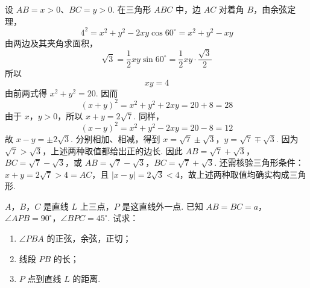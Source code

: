\begin{solution}
设 \(AB=x>0\)、\(BC=y>0\). 在三角形 \(ABC\) 中，边 \(AC\) 对着角 \(B\)，由余弦定理，
\[
4^2=x^2+y^2-2xy\cos60^\circ=x^2+y^2-xy
\]
由两边及其夹角求面积，
\[
\sqrt3=\frac12xy\sin60^\circ=\frac12xy\cdot\frac{\sqrt3}{2}
\]
所以
\[
xy=4
\]
由前两式得 \(x^2+y^2=20\). 因而
\[
(x+y)^2=x^2+y^2+2xy=20+8=28
\]
由于 \(x\)，\(y>0\)，所以 \(x+y=2\sqrt7\). 同样，
\[
(x-y)^2=x^2+y^2-2xy=20-8=12
\]
故 \(x-y=\pm2\sqrt3\). 分别相加、相减，得到 \(x=\sqrt7\pm\sqrt3\)，\(y=\sqrt7\mp\sqrt3\).
因为 \(\sqrt7>\sqrt3\)，上述两种取值都给出正的边长. 因此 \(AB=\sqrt7+\sqrt3\)，\(BC=\sqrt7-\sqrt3\)，或 \(AB=\sqrt7-\sqrt3\)，\(BC=\sqrt7+\sqrt3\). 还需核验三角形条件：\(x+y=2\sqrt7>4=AC\)，且 \(\left\lvert x-y\right\rvert=2\sqrt3<4\)，故上述两种取值均确实构成三角形.
\end{solution}

\begin{problem}
\(A\)，\(B\)，\(C\) 是直线 \(L\) 上三点，\(P\) 是这直线外一点. 已知 \(AB=BC=a\)，\(\angle APB=90^\circ\)，\(\angle BPC=45^\circ\). 试求：

\begin{enumerate}
\item \(\angle PBA\) 的正弦，余弦，正切；
\item 线段 \(PB\) 的长；
\item \(P\) 点到直线 \(L\) 的距离.
\end{enumerate}
\end{problem}

